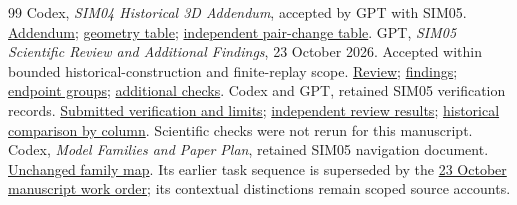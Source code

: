 \begin{thebibliography}{99}
 Codex, \emph{SIM04 Historical 3D Addendum}, accepted by GPT with SIM05. \href{evidence/studies/SIM05/SIM04_3D_ADDENDUM.md}{Addendum}; \href{evidence/tables/SIM05/SIM04_six_geometry.csv}{geometry table}; \href{evidence/reviews/SIM05/SIM04_normalized_pair_changes.csv}{independent pair-change table}.
 GPT, \emph{SIM05 Scientific Review and Additional Findings}, 23 October 2026. Accepted within bounded historical-construction and finite-replay scope. \href{evidence/reviews/SIM05/SIM05_GPT_SCIENTIFIC_REVIEW.md}{Review}; \href{evidence/reviews/SIM05/findings.json}{findings}; \href{evidence/reviews/SIM05/final_components.csv}{endpoint groups}; \href{evidence/reviews/SIM05/supplemental_checks.json}{additional checks}.
 Codex and GPT, retained SIM05 verification records. \href{evidence/studies/SIM05/VERIFICATION_AND_LIMITS.md}{Submitted verification and limits}; \href{evidence/reviews/SIM05/verification.json}{independent review results}; \href{evidence/tables/SIM05/historical_replay_columns.csv}{historical comparison by column}. Scientific checks were not rerun for this manuscript.
 Codex, \emph{Model Families and Paper Plan}, retained SIM05 navigation document. \href{evidence/studies/SIM05/MODEL_FAMILIES_AND_PAPER_PLAN.md}{Unchanged family map}. Its earlier task sequence is superseded by the \href{evidence/AUTHORITATIVE_WORK_ORDER.md}{23 October manuscript work order}; its contextual distinctions remain scoped source accounts.
\end{thebibliography}
